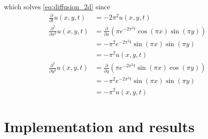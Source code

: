 \documentclass[10pt,a4paper]{article}
\newcommand{\fracpt}{\frac{\partial}{\partial t}}
\newcommand{\fracpx}{\frac{\partial}{\partial x}}
\newcommand{\fracpy}{\frac{\partial}{\partial y}}
\newcommand{\fracpxx}{\frac{\partial^2}{\partial x^2}}
\newcommand{\fracpyy}{\frac{\partial^2}{\partial y^2}}
\begin{document}
which solves \vref{eq:diffusion_2d} since
\begin{align}
\fracpt u(x, y, t) &= -2\pi^2 u(x, y, t) \\
\fracpxx u(x, y, t) &= \fracpx \left( \pi e^{-2\pi^2 t} \cos(\pi x) \sin(\pi y) \right) \\
&= -\pi^2 e^{-2\pi^2 t} \sin(\pi x) \sin(\pi y) \\
&= -\pi^2 u(x, y, t) \\
\fracpyy u(x, y, t) &= \fracpy \left( \pi e^{-2\pi^2 t} \sin(\pi x) \cos(\pi y) \right) \\
&= -\pi^2 e^{-2\pi^2 t} \sin(\pi x) \sin(\pi y) \\
&= -\pi^2 u(x, y, t)
\end{align}

\section{Implementation and results}\label{sec:implementation_and_results}




{}
\end{document}
